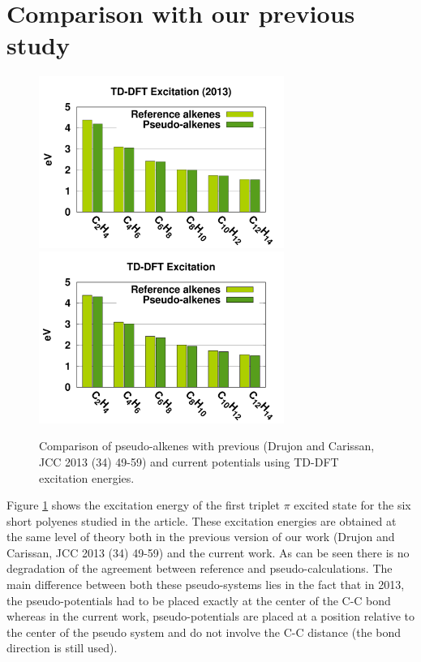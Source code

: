 \documentclass[aip]{revtex4-1}
\begin{document}
\section*{Comparison with our previous study}

\begin{figure}
\begin{center}
\includegraphics[width=8cm]{short_pbe0_tddft_2013}
\includegraphics[width=8cm]{short_pbe0_tddft}
\end{center}
\caption{Comparison of pseudo-alkenes with previous (Drujon and Carissan, JCC 2013 (34) 49-59) and current potentials using TD-DFT excitation energies.}
\label{fig:alkenes_tddft}
\end{figure}

Figure \ref{fig:alkenes_tddft} shows the excitation energy of the first triplet $\pi$ excited state
for the six short polyenes studied in the article.
These excitation energies are obtained at the same level of theory both in the previous
version of our work (Drujon and Carissan, JCC 2013 (34) 49-59) and the current work.
As can be seen there is no degradation of the agreement between reference and pseudo-calculations.
The main difference between both these pseudo-systems lies in the fact that in 2013, the pseudo-potentials
had to be placed exactly at the center of the C-C bond whereas in the current work, pseudo-potentials
are placed at a position relative to the center of the pseudo system and do not involve
the C-C distance (the bond direction is still used).
\end{document}
